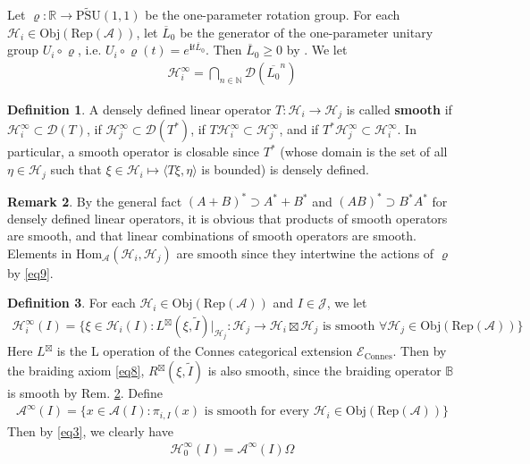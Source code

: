 \documentclass[11pt,b5paper,notitlepage]{article}
\theoremstyle{definition}
\newtheorem{df}{Definition}[section]
\newtheorem{rem}[df]{Remark}
\theoremstyle{plain}
\newcommand{\mc}{\mathcal}
\newcommand{\wtd}{\widetilde}
\newcommand{\ovl}{\overline}
\newcommand{\Hom}{\mathrm{Hom}}
\newcommand{\Rep}{\mathrm{Rep}}
\newcommand{\Dom}{\scr D}
\newcommand{\bk}[1]{\langle {#1}\rangle}
\newcommand{\scr}{\mathscr}
\newcommand{\im}{\mathbf{i}}
\newcommand{\mbb}{\mathbb}
\newcommand{\Nbb}{\mathbb N}
\newcommand{\Rbb}{\mathbb R}
\newcommand{\UPSU}{\widetilde{\mathrm{PSU}}(1,1)}
\newcommand{\Obj}{\mathrm{Obj}}
\numberwithin{equation}{section}
\begin{document}
Let $\varrho:\Rbb\rightarrow\UPSU$ be the one-parameter rotation group. For each $\mc H_i\in\Obj(\Rep(\mc A))$, let $\ovl L_0$ be the generator of the one-parameter unitary group $U_i\circ\varrho$, i.e. $U_i\circ\varrho(t)=e^{\im t\ovl L_0}$. Then $\ovl L_0\geq0$ by \cite[Thm. 3.8]{Wei06}. We let 
\begin{align}
\mc H_i^\infty=\bigcap_{n\in\Nbb}\Dom(\ovl{L_0}^n)\label{eq43}
\end{align}



\begin{df}
A densely defined linear operator $T:\mc H_i\rightarrow\mc H_j$ is called \textbf{smooth} if $\mc H_i^\infty\subset\Dom(T)$, if $\mc H_j^\infty\subset\Dom(T^*)$, if $T\mc H_i^\infty\subset\mc H_j^\infty$, and if $T^*\mc H_j^\infty\subset\mc H_i^\infty$. In particular, a smooth operator is closable since $T^*$ (whose domain is the set of all $\eta\in\mc H_j$ such that $\xi\in\mc H_i\mapsto\bk{T\xi,\eta}$ is bounded) is densely defined. 
\end{df}

\begin{rem}\label{lb3}
By the general fact $(A+B)^*\supset A^*+B^*$ and $(AB)^*\supset B^*A^*$ for densely defined linear operators, it is obvious that products of smooth operators are smooth, and that linear combinations of smooth operators are smooth. Elements in $\Hom_{\mc A}(\mc H_i,\mc H_j)$ are smooth since they intertwine the actions of $\varrho$ by \eqref{eq9}.
\end{rem}


\begin{df}\label{lb33}
For each $\mc H_i\in\Obj(\Rep(\mc A))$ and $I\in\mc J$, we let 
\begin{align*}
\mc H_i^\infty(I)=\{\xi\in\mc H_i(I):L^\boxtimes(\xi,\wtd I)|_{\mc H_j}:\mc H_j\rightarrow\mc H_i\boxtimes\mc H_j\text{ is smooth }\forall \mc H_j\in\Obj(\Rep(\mc A))\}
\end{align*}
Here $L^\boxtimes$ is the L operation of the Connes categorical extension $\scr E_{\mathrm{Connes}}$. Then by the braiding axiom \eqref{eq8},  $R^\boxtimes(\xi,\wtd I)$ is also smooth, since the braiding operator $\mbb B$ is smooth by Rem. \ref{lb3}. Define
\begin{align*}
\mc A^\infty(I)=\{x\in\mc A(I):\pi_{i,I}(x)\text{ is smooth for every }\mc H_i\in\Obj(\Rep(\mc A))\}
\end{align*}
Then by \eqref{eq3}, we clearly have
\begin{align*}
\mc H_0^\infty(I)=\mc A^\infty(I)\Omega
\end{align*}
\end{df}
\end{document}
